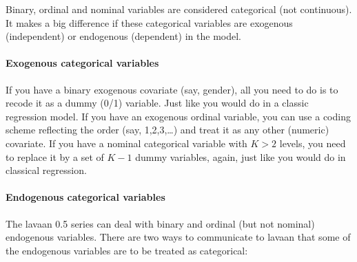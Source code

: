 Binary, ordinal and nominal variables are considered categorical (not
continuous). It makes a big difference if these categorical variables
are exogenous (independent) or endogenous (dependent) in the model.

\hypertarget{exogenous-categorical-variables}{%
\paragraph{Exogenous categorical
variables}\label{exogenous-categorical-variables}}

If you have a binary exogenous covariate (say, gender), all you need to
do is to recode it as a dummy (0/1) variable. Just like you would do in
a classic regression model. If you have an exogenous ordinal variable,
you can use a coding scheme reflecting the order (say, 1,2,3,\ldots) and
treat it as any other (numeric) covariate. If you have a nominal
categorical variable with \(K > 2\) levels, you need to replace it by a
set of \(K-1\) dummy variables, again, just like you would do in
classical regression.

\hypertarget{endogenous-categorical-variables}{%
\paragraph{Endogenous categorical
variables}\label{endogenous-categorical-variables}}

The lavaan 0.5 series can deal with binary and ordinal (but not nominal)
endogenous variables. There are two ways to communicate to lavaan that
some of the endogenous variables are to be treated as categorical:

